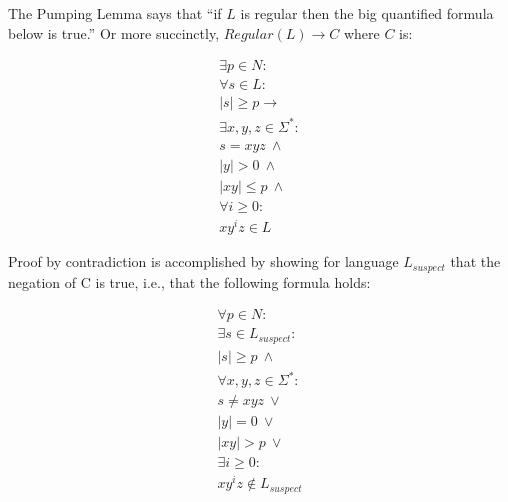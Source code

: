 \documentclass{article}
\begin{document}

The Pumping Lemma says that ``if $L$ is regular then the big quantified formula below is true.''  Or more succinctly, $Regular(L) \rightarrow C$ where $C$ is:

\begin{center}\[
\begin{array}{r}
\exists p \in N :\\
\forall s \in L : \\
|s| \geq p \rightarrow \\
\exists x, y, z \in \Sigma^* : \\
s = xyz\ \land \\
|y| > 0\ \land \\
|xy| \leq p\ \land \\
\forall i \geq 0 : \\
xy^iz \in L
\end{array}\]
\end{center}

Proof by contradiction is accomplished by showing for language $L_{suspect}$ that the negation of C is true, i.e., that the following formula holds:

\begin{center}\[
\begin{array}{r}
\forall p \in N :\\
\exists s \in L_{suspect} : \\
|s| \geq p\ \land \\
\forall x, y, z \in \Sigma^* : \\
s \neq xyz\ \lor \\
|y| = 0\ \lor \\
|xy| > p\ \lor \\
\exists i \geq 0 : \\
xy^iz \notin L_{suspect}
\end{array}\]
\end{center}
\end{document}
